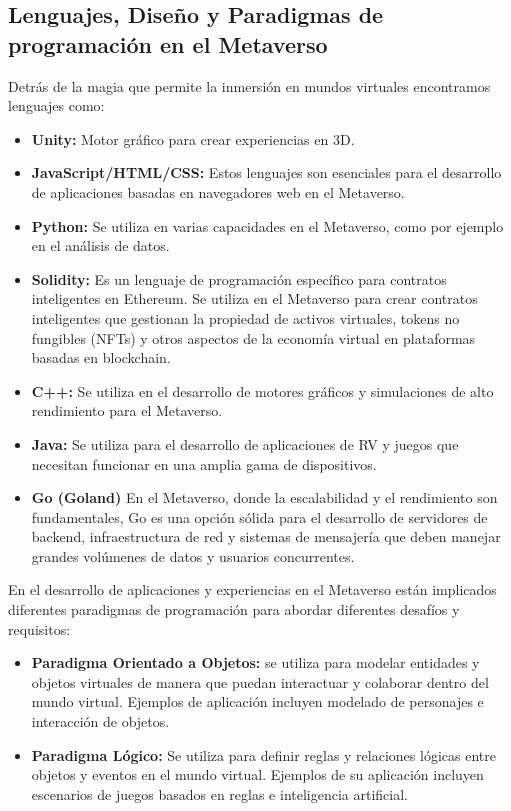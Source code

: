 \documentclass[a4paper,10pt]{article}
\begin{document}
	\subsection{Lenguajes, Diseño y Paradigmas de programación en el Metaverso}
	{\normalsize Detrás de la magia que permite la inmersión en mundos virtuales encontramos lenguajes como:
		\begin{itemize}
			\item \textbf{Unity:} Motor gráfico para crear experiencias en 3D.
			\item \textbf{JavaScript/HTML/CSS:} Estos lenguajes son esenciales para el desarrollo de aplicaciones basadas en navegadores web en el Metaverso.
			\item \textbf{Python:} Se utiliza en varias capacidades en el Metaverso, como por ejemplo en el análisis de datos.
			\item \textbf{Solidity:} Es un lenguaje de programación específico para contratos inteligentes en Ethereum. Se utiliza en el Metaverso para crear contratos inteligentes que gestionan la propiedad de activos virtuales, tokens no fungibles (NFTs) y otros aspectos de la economía virtual en plataformas basadas en blockchain.
			\item \textbf{C++:} Se utiliza en el desarrollo de motores gráficos y simulaciones de alto rendimiento para el Metaverso.
			\item \textbf{Java:} Se utiliza para el desarrollo de aplicaciones de RV y juegos que necesitan funcionar en una amplia gama de dispositivos.
			\item \textbf{Go (Goland)} En el Metaverso, donde la escalabilidad y el rendimiento son fundamentales, Go es una opción sólida para el desarrollo de servidores de backend, infraestructura de red y sistemas de mensajería que deben manejar grandes volúmenes de datos y usuarios concurrentes.
		\end{itemize}
		En el desarrollo de aplicaciones y experiencias en el Metaverso están implicados diferentes paradigmas de programación para abordar diferentes desafíos y requisitos:
		\begin{itemize}
			\item \textbf{Paradigma Orientado a Objetos:} se utiliza para modelar entidades y objetos virtuales de manera que puedan interactuar y colaborar dentro del mundo virtual. Ejemplos de aplicación incluyen modelado de personajes e interacción de objetos.
			\item \textbf{Paradigma Lógico:} Se utiliza para definir reglas y relaciones lógicas entre objetos y eventos en el mundo virtual. Ejemplos de su aplicación incluyen escenarios de juegos basados en reglas e inteligencia artificial.

\end{itemize}}
\end{document}
